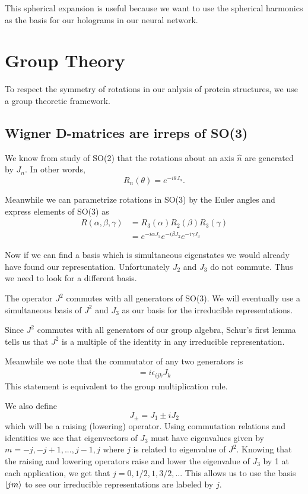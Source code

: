 \documentclass{article}
\begin{document}
This spherical expansion is useful because we want to use the spherical harmonics as the basis for our holograms in our neural network.

%
%
\section{Group Theory}

To respect the symmetry of rotations in our anlysis of protein structures, we use a group theoretic framework. 

\subsection{Wigner D-matrices are irreps of SO(3)}
We know from study of SO(2) that the rotations about an axis $\hat{n}$ are generated by $J_n$. In other words, $$R_n(\theta) = e^{-i\theta J_n} .$$

Meanwhile we can parametrize rotations in SO(3) by the Euler angles and express elements of SO(3) as 
\begin{align}
    R(\alpha,\beta,\gamma) &= R_3(\alpha)R_2(\beta)R_3(\gamma)\\
    &= e^{-i\alpha J_3} e^{-i\beta J_2} e^{-i\gamma J_3}
\end{align}

Now if we can find a basis which is simultaneous eigenstates we would already have found our representation. Unfortunately $J_2$ and $J_3$ do not commute. Thus we need to look for a different basis. 

The operator $J^2$ commutes with all generators of SO(3). We will eventually use a simultaneous basis of $J^2$ and $J_3$ as our basis for the irreducible representations. 

Since $J^2$ commutes with all generators of our group algebra, Schur's first lemma tells us that $J^2$ is a multiple of the identity in any irreducible representation. 

Meanwhile we note that the commutator of any two generators is \begin{align}
    [J_i,J_j] = i \epsilon_{ijk}J_k
\end{align}
This statement is equivalent to the group multiplication rule.

We also define $$J_{\pm} = J_1 \pm iJ_2$$ which will be a raising (lowering) operator. Using commutation relations and identities we see that eigenvectors of $J_3$ must have eigenvalues given by $m = -j,-j+1,...,j-1,j$ where $j$ is related to eigenvalue of $J^2$. Knowing that the raising and lowering operators raise and lower the eigenvalue of $J_3$ by 1 at each application, we get that $j = 0,1/2,1,3/2,...$ 
This allows us to use the basis $\ket{jm}$ to see our irreducible representations are labeled by $j$.
\end{document}
